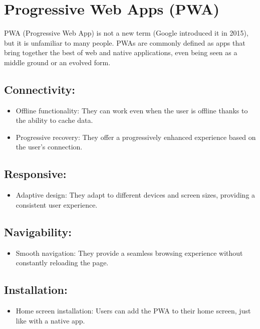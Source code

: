 \documentclass{article}
\begin{document}
\section*{Progressive Web Apps (PWA)}

PWA (Progressive Web App) is not a new term (Google introduced it in 2015), but it is unfamiliar to many people. PWAs are commonly defined as apps that bring together the best of web and native applications, even being seen as a middle ground or an evolved form.

\subsection*{Connectivity:}
\begin{itemize}
  \item Offline functionality: They can work even when the user is offline thanks to the ability to cache data.
  \item Progressive recovery: They offer a progressively enhanced experience based on the user's connection.
\end{itemize}

\subsection*{Responsive:}
\begin{itemize}
  \item Adaptive design: They adapt to different devices and screen sizes, providing a consistent user experience.
\end{itemize}

\subsection*{Navigability:}
\begin{itemize}
  \item Smooth navigation: They provide a seamless browsing experience without constantly reloading the page.
\end{itemize}

\subsection*{Installation:}
\begin{itemize}
  \item Home screen installation: Users can add the PWA to their home screen, just like with a native app.
\end{itemize}
\end{document}
